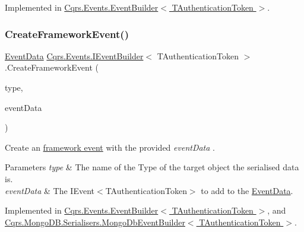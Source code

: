 Implemented in \hyperlink{classCqrs_1_1Events_1_1EventBuilder_abcc2515f98e4852ab656f1868e7a344c_abcc2515f98e4852ab656f1868e7a344c}{Cqrs.\+Events.\+Event\+Builder$<$ T\+Authentication\+Token $>$}.

\mbox{\label{interfaceCqrs_1_1Events_1_1IEventBuilder_ac77123302de4e79df9661c13219af4d4_ac77123302de4e79df9661c13219af4d4}} 
\subsubsection{\texorpdfstring{Create\+Framework\+Event()}{CreateFrameworkEvent()}\hspace{0.1cm}{\footnotesize\ttfamily [2/2]}}
{\footnotesize\ttfamily \hyperlink{classCqrs_1_1Events_1_1EventData}{Event\+Data} \hyperlink{interfaceCqrs_1_1Events_1_1IEventBuilder}{Cqrs.\+Events.\+I\+Event\+Builder}$<$ T\+Authentication\+Token $>$.Create\+Framework\+Event (\begin{DoxyParamCaption}\item[{string}]{type,  }\item[{\hyperlink{interfaceCqrs_1_1Events_1_1IEvent}{I\+Event}$<$ T\+Authentication\+Token $>$}]{event\+Data }\end{DoxyParamCaption})}



Create an \hyperlink{}{framework event} with the provided {\itshape event\+Data} . 


\begin{DoxyParams}{Parameters}
{\em type} & The name of the Type of the target object the serialised data is.\\
\hline
{\em event\+Data} & The I\+Event$<$\+T\+Authentication\+Token$>$ to add to the \hyperlink{classCqrs_1_1Events_1_1EventData}{Event\+Data}.\\
\hline
\end{DoxyParams}


Implemented in \hyperlink{classCqrs_1_1Events_1_1EventBuilder_aa6a794ef27f2795802a4390fd16535f6_aa6a794ef27f2795802a4390fd16535f6}{Cqrs.\+Events.\+Event\+Builder$<$ T\+Authentication\+Token $>$}, and \hyperlink{classCqrs_1_1MongoDB_1_1Serialisers_1_1MongoDbEventBuilder_a06afbb994fd3f679f275dea3d1d60c6e_a06afbb994fd3f679f275dea3d1d60c6e}{Cqrs.\+Mongo\+D\+B.\+Serialisers.\+Mongo\+Db\+Event\+Builder$<$ T\+Authentication\+Token $>$}.

